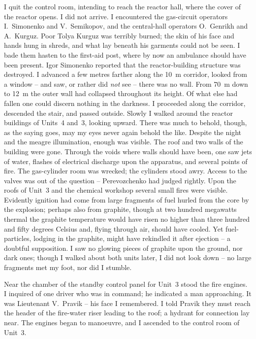 \documentclass[openright]{bookest}
\begin{document}
I quit the control room, intending to reach the reactor hall, where the cover of the reactor opens. I did not arrive. I encountered the gas-circuit operators I.~Simonenko and V.~Semikopov, and the central-hall operators O.~Genrikh and A.~Kurguz. Poor Tolya Kurguz was terribly burned; the skin of his face and hands hung in shreds, and what lay beneath his garments could not be seen. I bade them hasten to the first-aid post, where by now an ambulance should have been present. Igor Simonenko reported that the reactor-building structure was destroyed. I advanced a few metres farther along the \qty{+10}{\metre} corridor, looked from a window -- and saw, or rather did \textit{not} see -- there was no wall. From \qty{+70}{\metre} down to \qty{+12}{\metre} the outer wall had collapsed throughout its height. Of what else had fallen one could discern nothing in the darkness. I proceeded along the corridor, descended the stair, and passed outside. Slowly I walked around the reactor buildings of Units~4 and~3, looking upward. There was much to behold, though, as the saying goes, may my eyes never again behold the like. Despite the night and the meagre illumination, enough was visible. The roof and two walls of the building were gone. Through the voids where walls should have been, one saw jets of water, flashes of electrical discharge upon the apparatus, and several points of fire. The gas-cylinder room was wrecked; the cylinders stood awry. Access to the valves was out of the question -- Perevozchenko had judged rightly. Upon the roofs of Unit~3 and the chemical workshop several small fires were visible. Evidently ignition had come from large fragments of fuel hurled from the core by the explosion; perhaps also from graphite, though at two hundred megawatts thermal the graphite temperature would have risen no higher than three hundred and fifty degrees Celsius and, flying through air, should have cooled. Yet fuel-particles, lodging in the graphite, might have rekindled it after ejection -- a doubtful supposition. I saw no glowing pieces of graphite upon the ground, nor dark ones; though I walked about both units later, I did not look down -- no large fragments met my foot, nor did I stumble.

Near the chamber of the standby control panel for Unit~3 stood the fire engines. I inquired of one driver who was in command; he indicated a man approaching. It was Lieutenant V.~Pravik -- his face I remembered. I told Pravik they must reach the header of the fire-water riser leading to the roof; a hydrant for connection lay near. The engines began to manoeuvre, and I ascended to the control room of Unit~3.
\end{document}
